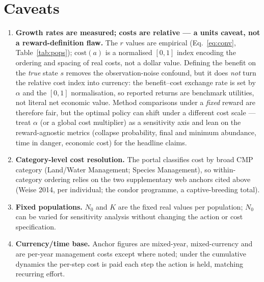 \documentclass[11pt]{article}
\begin{document}
\section{Caveats}
\begin{enumerate}[leftmargin=1.6em,nosep]
\item \textbf{Growth rates are measured; costs are relative --- a units caveat, not a
reward-definition flaw.} The $r$ values are empirical (Eq.~\ref{eq:conv},
Table~\ref{tab:pops}); $\mathrm{cost}(a)$ is a normalised $[0,1]$ index encoding the
ordering and spacing of real costs, not a dollar value. Defining the benefit on the
\emph{true} state $s$ removes the observation-noise confound, but it does \emph{not}
turn the relative cost index into currency: the benefit--cost exchange rate is set by
$\alpha$ and the $[0,1]$ normalisation, so reported returns are benchmark utilities, not
literal net economic value. Method comparisons under a \emph{fixed} reward are therefore
fair, but the optimal policy can shift under a different cost scale --- treat $\alpha$
(or a global cost multiplier) as a sensitivity axis and lean on the reward-agnostic
metrics (collapse probability, final and minimum abundance, time in danger, economic
cost) for the headline claims.
\item \textbf{Category-level cost resolution.} The portal classifies cost by broad
CMP category (Land/Water Management; Species Management), so within-category ordering
relies on the two supplementary web anchors cited above (Weise 2014, per individual; the condor programme, a captive-breeding total).
\item \textbf{Fixed populations.} $N_0$ and $K$ are the fixed real values per
population; $N_0$ can be varied for sensitivity analysis without changing the action
or cost specification.
\item \textbf{Currency/time base.} Anchor figures are mixed-year, mixed-currency and
are per-year management costs except where noted; under the cumulative dynamics the
per-step cost is paid each step the action is held, matching recurring effort.
\end{enumerate}

\clearpage
\appendix
\end{document}
